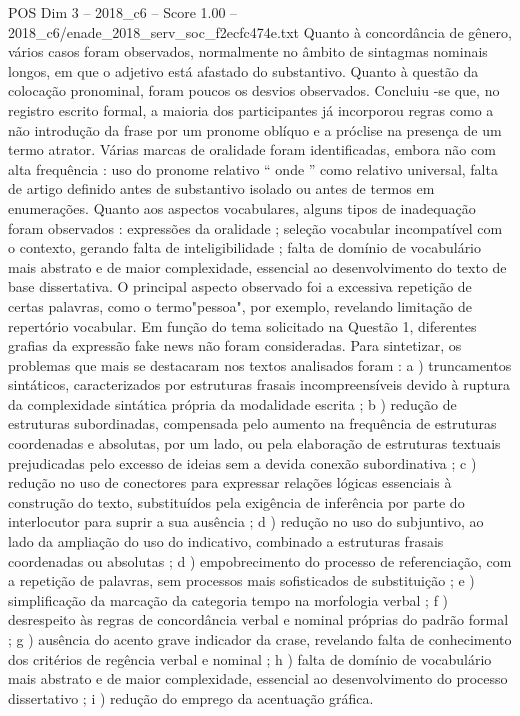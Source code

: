 \begin{textsample}{POS Dim 3 – 2018\_c6 – Score 1.00 – 2018\_c6/enade\_2018\_serv\_soc\_f2ecfc474e.txt}
Quanto à concordância de gênero, vários casos foram observados, normalmente no âmbito de sintagmas nominais longos, em que o adjetivo está afastado do substantivo.
Quanto à questão da colocação pronominal, foram poucos os desvios observados.
Concluiu -se que, no registro escrito formal, a maioria dos participantes já incorporou regras como a não introdução da frase por um pronome oblíquo e a próclise na presença de um termo atrator.
Várias marcas de oralidade foram identificadas, embora não com alta frequência : uso do pronome relativo “ onde ” como relativo universal, falta de artigo definido antes de substantivo isolado ou antes de termos em enumerações.
Quanto aos aspectos vocabulares, alguns tipos de inadequação foram observados : expressões da oralidade ; seleção vocabular incompatível com o contexto, gerando falta de inteligibilidade ; falta de domínio de vocabulário mais abstrato e de maior complexidade, essencial ao desenvolvimento do texto de base dissertativa.
O principal aspecto observado foi a excessiva repetição de certas palavras, como o termo"pessoa", por exemplo, revelando limitação de repertório vocabular.
Em função do tema solicitado na Questão 1, diferentes grafias da expressão fake news não foram consideradas.
Para sintetizar, os problemas que mais se destacaram nos textos analisados foram : a ) truncamentos sintáticos, caracterizados por estruturas frasais incompreensíveis devido à ruptura da complexidade sintática própria da modalidade escrita ; b ) redução de estruturas subordinadas, compensada pelo aumento na frequência de estruturas coordenadas e absolutas, por um lado, ou pela elaboração de estruturas textuais prejudicadas pelo excesso de ideias sem a devida conexão subordinativa ; c ) redução no uso de conectores para expressar relações lógicas essenciais à construção do texto, substituídos pela exigência de inferência por parte do interlocutor para suprir a sua ausência ; d ) redução no uso do subjuntivo, ao lado da ampliação do uso do indicativo, combinado a estruturas frasais coordenadas ou absolutas ; d ) empobrecimento do processo de referenciação, com a repetição de palavras, sem processos mais sofisticados de substituição ; e ) simplificação da marcação da categoria tempo na morfologia verbal ; f ) desrespeito às regras de concordância verbal e nominal próprias do padrão formal ; g ) ausência do acento grave indicador da crase, revelando falta de conhecimento dos critérios de regência verbal e nominal ; h ) falta de domínio de vocabulário mais abstrato e de maior complexidade, essencial ao desenvolvimento do processo dissertativo ; i ) redução do emprego da acentuação gráfica.

\end{textsample}
